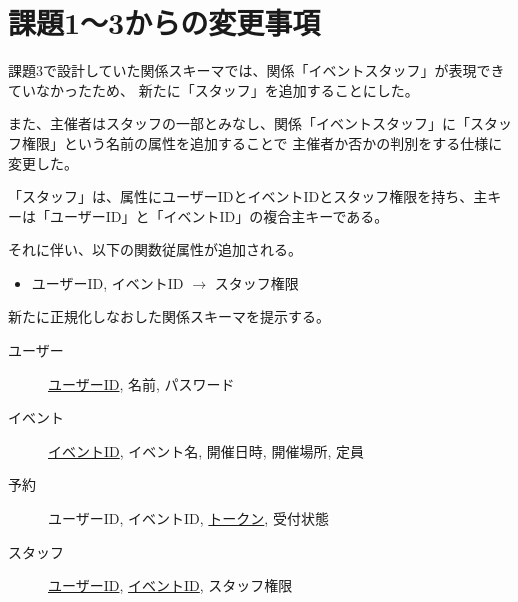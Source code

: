 \section{課題1〜3からの変更事項}
課題3で設計していた関係スキーマでは、関係「イベントスタッフ」が表現できていなかったため、
新たに「スタッフ」を追加することにした。

また、主催者はスタッフの一部とみなし、関係「イベントスタッフ」に「スタッフ権限」という名前の属性を追加することで
主催者か否かの判別をする仕様に変更した。

「スタッフ」は、属性にユーザーIDとイベントIDとスタッフ権限を持ち、主キーは「ユーザーID」と「イベントID」の複合主キーである。

それに伴い、以下の関数従属性が追加される。
\begin{itemize}
  \item {ユーザーID, イベントID} $\rightarrow$ {スタッフ権限}
\end{itemize}

新たに正規化しなおした関係スキーマを提示する。
\begin{description}
  \item[ユーザー] \underline{ユーザーID}, 名前, パスワード
  \item[イベント] \underline{イベントID}, イベント名, 開催日時, 開催場所, 定員
  \item[予約] ユーザーID, イベントID, \underline{トークン}, 受付状態
  \item[スタッフ] \underline{ユーザーID}, \underline{イベントID}, スタッフ権限
\end{description}